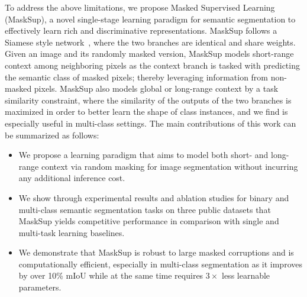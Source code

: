 \documentclass{bmvc2k}
\begin{document}
To address the above limitations, we propose Masked Supervised Learning (MaskSup), a novel single-stage learning paradigm for semantic segmentation to effectively learn rich and discriminative representations. MaskSup follows a Siamese style network~\cite{bromley1993signature}, where the two branches are identical and share weights. Given an image and its randomly masked version, MaskSup models short-range context among neighboring pixels as the context branch is tasked with predicting the semantic class of masked pixels; thereby leveraging information from non-masked pixels. MaskSup also models global or long-range context by a task similarity constraint, where the similarity of the outputs of the two branches is maximized in order to better learn the shape of class instances, and we find is especially useful in multi-class settings. The main contributions of this work can be summarized as follows:
\begin{itemize}
\item We propose a learning paradigm that aims to model both short- and long-range context via random masking for image segmentation without incurring any additional inference cost.
\item We show through experimental results and ablation studies for binary and multi-class semantic segmentation tasks on three public datasets that MaskSup yields competitive performance in comparison with single and multi-task learning baselines.
\item We demonstrate that MaskSup is robust to large masked corruptions and is computationally efficient, especially in multi-class segmentation as it improves by over 10\% mIoU while at the same time requires $3\times$ less learnable parameters.
\end{itemize}
\end{document}

